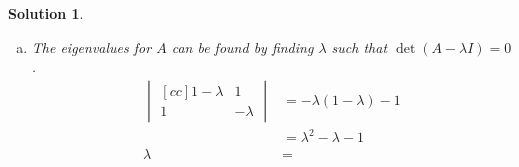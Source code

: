 \documentclass[11pt]{scrartcl}
\theoremstyle{dotlessP}
\newtheorem{sol}{Solution}[section]
\theoremstyle{dotlessN}
\begin{document}
\begin{sol}
\begin{enumerate}[(a)]
\begin{proof}
			\textit{Inductive Hypothesis}: Assume for purposes of induction that $P(k)$ is true, $k > 0$. We will show that $P(k) \implies P(k+1)$.

			\textit{Inductive Step}: From our inductive hypothesis, $A^k 
\begin{bmatrix}
	1 \\
	0
\end{bmatrix} = 
\begin{bmatrix}[c]
	f_{k+1} \\
	f_k
\end{bmatrix}
			$. We left-multiply both sides by $A$ to obtain
			\[
			AA^k 
			\begin{bmatrix}
				1 \\
				0
			\end{bmatrix} = 
			A
			\begin{bmatrix}[c]
				f_{k+1} \\
				f_k
			\end{bmatrix}
			\] 
			$AA^k = A^{k+1}$, and from Part (a), we have shown that $
A
\begin{bmatrix}[c]
	f_{k+1} \\
	f_k
\end{bmatrix} = 
\begin{bmatrix}[c]
	f_{k+2} \\
	f_{k+1}
\end{bmatrix}
			$. Thus, we can simplify:
			\[
				A^{k+1}
				\begin{bmatrix}
					1 \\
					0
				\end{bmatrix} = 
				\begin{bmatrix}[c]
					f_{k+2} \\
					f_{k+1}
				\end{bmatrix}
			\] 
			As we have shown that $P(k) \implies P(k+1)$, by the principle of mathematical induction, we have shown that $P(n)$ is true, $n \geq 0$.
			\end{proof}
		\item The eigenvalues for $A$ can be found by finding $\lambda$ such that $\det(A - \lambda I) = 0$.
			\begin{align*}
				\begin{vmatrix}[cc]
					1 - \lambda & 1 \\
					1 & -\lambda
				\end{vmatrix} &= -\lambda(1-\lambda) - 1\\
				&= \lambda^2 - \lambda - 1 \\
				\lambda &= 

\end{align*}
\end{enumerate}
\end{sol}
\end{document}
